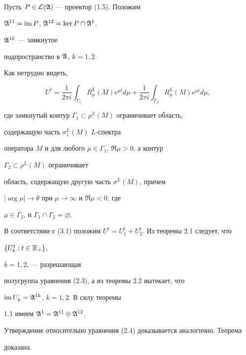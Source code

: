 \begin{pf} Пусть $P\in\cal L(\frak A)$ --- проектор (1.5). Положим 


$\frak A^{11}=\operatorname{im} P$, $\frak A^{12}=\ker P\cap\frak A^1$. 


$\frak A^{1k}$ --- замкнутое 


подпространство в $\frak A$, $k=1,2$. 


 


Как нетрудно видеть, 


\begin{equation} 


U^t=\frac{1}{2\pi i}\int_{\Gamma_1}R^L_\mu(M)e^{\mu t}d\mu + 


\frac{1}{2\pi i}\int_{\Gamma_2}R^L_\mu(M)e^{\mu t}d\mu, 


\end{equation} 


где замкнутый контур $\Gamma_1\subset\rho^L(M)$ ограничивает область, 


содержащую часть $\sigma^L_1(M)$ $L$-спектра 


оператора $M$ и для любого $\mu\in\Gamma_1$, $\Re \mu>0$, а контур 


$\Gamma_2\subset\rho^L(M)$ ограничивает 


область, содержащую другую часть $\sigma^L(M)$, причем 


$|\arg \mu|\to\theta$ при $\mu\to\infty$ и $\Re \mu<0$, где 


$\mu\in\Gamma_2$, и $\Gamma_1\cap\Gamma_2=\varnothing$. 


 


В соответствии с (3.1) положим $U^t=U^t_1+U^t_2$. Из теоремы 2.1 следует, что 


$\{U^t_k:t\in\Bbb R_+\}$,\linebreak




$k=1,2$, --- разрешающая 


полугруппа уравнения (2.3), а из теоремы 2.2 вытекает, что 


$\operatorname{im} U^{\textstyle\cdot}_k=\frak A^{1k}$, $k=1,2$. В силу теоремы 


1.1 имеем $\frak A^1=\frak A^{11}\oplus\frak A^{12}$. 


 


Утверждение относительно уравнения (2.4) доказывается аналогично. Теорема 


доказана. 


\end{pf} 


